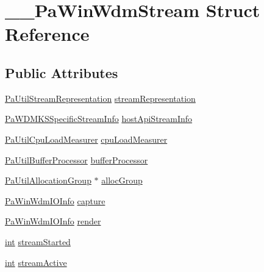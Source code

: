 \hypertarget{struct_____pa_win_wdm_stream}{}\section{\+\_\+\+\_\+\+Pa\+Win\+Wdm\+Stream Struct Reference}
\label{struct_____pa_win_wdm_stream}
\subsection*{Public Attributes}
\begin{DoxyCompactItemize}
\item 
\hyperlink{struct_pa_util_stream_representation}{Pa\+Util\+Stream\+Representation} \hyperlink{struct_____pa_win_wdm_stream_a7e4e2c52c81ca859f290909b0e9868a6}{stream\+Representation}
\item 
\hyperlink{struct_pa_w_d_m_k_s_specific_stream_info}{Pa\+W\+D\+M\+K\+S\+Specific\+Stream\+Info} \hyperlink{struct_____pa_win_wdm_stream_a3dbf6fed2412e92984b34fba10cbfeb5}{host\+Api\+Stream\+Info}
\item 
\hyperlink{struct_pa_util_cpu_load_measurer}{Pa\+Util\+Cpu\+Load\+Measurer} \hyperlink{struct_____pa_win_wdm_stream_ad77f1764e2de9c5a9d2b05ee1a4565ee}{cpu\+Load\+Measurer}
\item 
\hyperlink{struct_pa_util_buffer_processor}{Pa\+Util\+Buffer\+Processor} \hyperlink{struct_____pa_win_wdm_stream_a2c900cef33bbe8ae112f0de607c61335}{buffer\+Processor}
\item 
\hyperlink{struct_pa_util_allocation_group}{Pa\+Util\+Allocation\+Group} $\ast$ \hyperlink{struct_____pa_win_wdm_stream_a4dd31c3219fcd2e7cfd39dbf2006d08d}{alloc\+Group}
\item 
\hyperlink{pa__win__wdmks_8c_ac3893d31d094c8c05362e8e99830d488}{Pa\+Win\+Wdm\+I\+O\+Info} \hyperlink{struct_____pa_win_wdm_stream_a31e13c53819af64975bdc06cdc8a164d}{capture}
\item 
\hyperlink{pa__win__wdmks_8c_ac3893d31d094c8c05362e8e99830d488}{Pa\+Win\+Wdm\+I\+O\+Info} \hyperlink{struct_____pa_win_wdm_stream_a29a9901256d26f88976f259bac0605e8}{render}
\item 
\hyperlink{xmltok_8h_a5a0d4a5641ce434f1d23533f2b2e6653}{int} \hyperlink{struct_____pa_win_wdm_stream_ab3122c31d95fb7481d45e375fa9a5a3f}{stream\+Started}
\item 
\hyperlink{xmltok_8h_a5a0d4a5641ce434f1d23533f2b2e6653}{int} \hyperlink{struct_____pa_win_wdm_stream_a1f917538ec25eacc82713745052815f1}{stream\+Active}

\end{DoxyCompactItemize}
